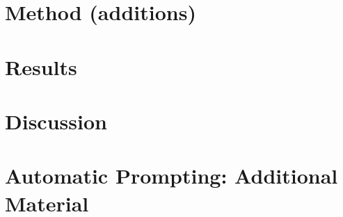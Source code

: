 \documentclass[11pt,a4paper]{report}
\begin{document}
\chapter{Method (additions)}
\setcounter{section}{5}

\chapter{Results}
\setcounter{section}{2}

\chapter{Discussion}

\appendix
\chapter{Automatic Prompting: Additional Material}


\end{document}
